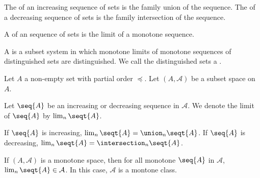 
\sbasic






















\sstart
{}





The
of an increasing sequence
of sets is the family
union of the sequence.
The
of a decreasing sequence
of sets is the family
intersection of the sequence.

A
of an sequence of sets
is the limit of a
monotone sequence.

A
is a
subset system in which
monotone limits of
 monotone sequences
of distinguished sets are distinguished.
We call the distinguished sets a
.


Let $A$ a non-empty set with
partial order $\preceq$.
Let $(A, \mathcal{A})$ be a
subset space on $A$.

Let $\seq{A}$ be an increasing
or decreasing sequence in $\mathcal{A}$.
We denote the limit of $\seq{A}$
by $\lim_{n} \seqt{A}$.

If $\seq{A}$ is increasing,
$\lim_n \seqt{A} = \union_{n} \seqt{A}$.
If $\seq{A}$ is decreasing,
$\lim_n \seqt{A} = \intersection_{n} \seqt{A}$.

If $(A, \mathcal{A})$ is a monotone space,
then for all monotone
$\seq{A}$ in $\mathcal{A}$,
$\lim_{n} \seqt{A} \in \mathcal{A}$.
In this case, $\mathcal{A}$ is a montone class.
\strats
